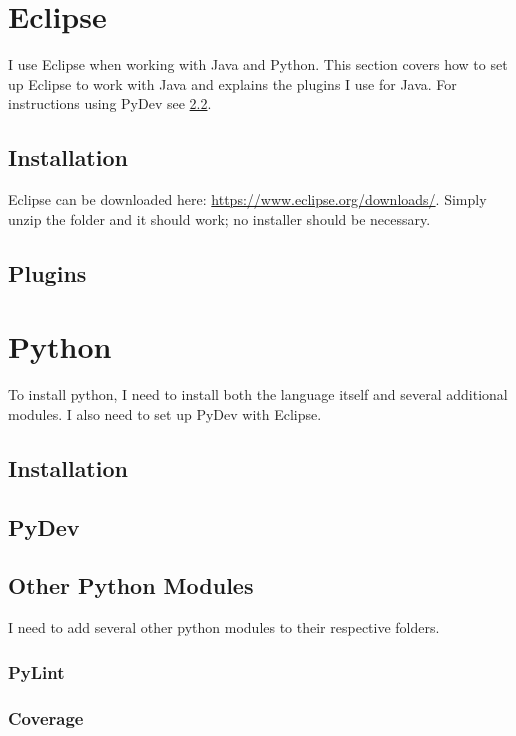 \documentclass{article}
\begin{document}
\section{Eclipse}

I use Eclipse when working with Java and Python.
This section covers how to set up Eclipse to work with Java and explains the plugins I use for Java.
For instructions using PyDev see \cref{subsec:PyDev}.

\subsection{Installation}
Eclipse can be downloaded here: \url{https://www.eclipse.org/downloads/}.
Simply unzip the folder and it should work; no installer should be necessary.

\subsection{Plugins}

\section{Python}

To install python, I need to install both the language itself and several additional modules.
I also need to set up PyDev with Eclipse.

\subsection{Installation}

\subsection{PyDev}
\label{subsec:PyDev}

\subsection{Other Python Modules}

I need to add several other python modules to their respective folders.

\subsubsection{PyLint}

\subsubsection{Coverage}
\end{document}
